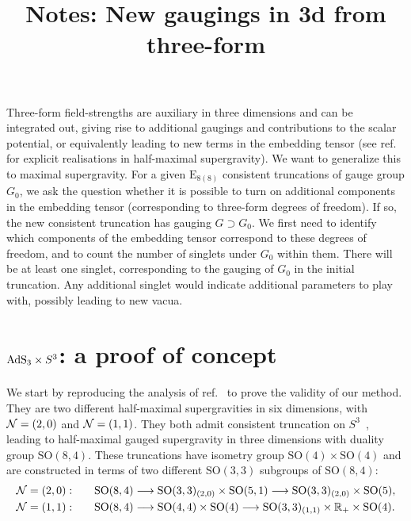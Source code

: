 \documentclass[11pt]{article}
\title{Notes: New gaugings in 3d from three-form}
\author{}
\newcommand{\SO}{\ensuremath{\mathrm{SO}}\xspace}
\newcommand{\E}{\ensuremath{\mathrm{E}}\xspace}
\newcommand{\R}{\ensuremath{\mathbb{R}}\xspace}
\begin{document}
\maketitle

Three-form field-strengths are auxiliary in three dimensions and can be integrated out, giving rise to additional gaugings and contributions to the scalar potential, or equivalently leading to new terms in the embedding tensor (see ref.~\cite{Deger:2014ofa,Eloy:2021fhc} for explicit realisations in half-maximal supergravity). We want to generalize this to maximal supergravity. For a given $\E_{8(8)}$ consistent truncations of gauge group $G_{0}$, we ask the question whether it is possible to turn on additional components in the embedding tensor (corresponding to three-form degrees of freedom). If so, the new consistent truncation has gauging $G\supset G_{0}$. We first need to identify which components of the embedding tensor correspond to these degrees of freedom, and to count the number of singlets under $G_{0}$ within them. There will be at least one singlet, corresponding to the gauging of $G_{0}$ in the initial truncation. Any additional singlet would indicate additional parameters to play with, possibly leading to new vacua.

\section{\texorpdfstring{${\rm AdS}_{3}\times S^{3}$}{AdS3xS3}: a proof of concept}
We start by reproducing the analysis of ref.~\cite{Eloy:2021fhc} to prove the validity of our method. They are two different half-maximal supergravities in six dimensions, with ${\cal N}=(2,0)$ and ${\cal N}=(1,1)$. They both admit consistent truncation on $S^{3}$~\cite{Hohm:2017wtr,Samtleben:2019zrh}, leading to half-maximal gauged supergravity in three dimensions with duality group $\SO(8,4)$. These truncations have isometry group $\SO(4)\times\SO(4)$ and are constructed in terms of two different $\SO(3,3)$ subgroups of $\SO(8,4)$:
\begin{subequations}
  \begin{align}
    {\cal N}=(2,0):&\qquad \SO(8,4)\longrightarrow\SO(3,3)_{(2,0)}\times \SO(5,1)\longrightarrow\SO(3,3)_{(2,0)}\times \SO(5), \label{eq:SO84decomp20}\\
    {\cal N}=(1,1):&\qquad \SO(8,4)\longrightarrow\SO(4,4)\times \SO(4)\longrightarrow\SO(3,3)_{(1,1)}\times\R_{+}\times\SO(4). \label{eq:SO84decomp11}
  \end{align}
\end{subequations}
\end{document}
